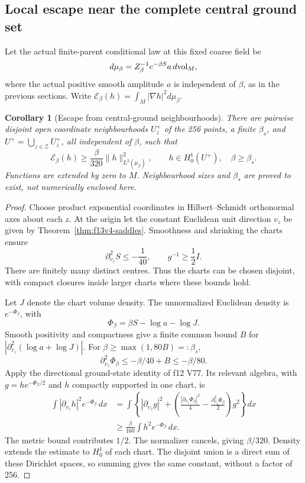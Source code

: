 \documentclass[11pt,oneside]{article}
\newtheorem{corollary}[theorem]{Corollary}
\newcommand{\E}{\mathcal E}
\begin{document}
\subsection{Local escape near the complete central ground set}

Let the actual finite-parent conditional law at this
fixed coarse field be
\[
 d\mu_\beta=Z_\beta^{-1}e^{-\beta S}a\,d{\rm vol}_M ,
\]
where the actual positive smooth amplitude \(a\) is
independent of \(\beta\), as in the previous sections.
Write \(\E_\beta(h)=\int_M|\nabla h|^2d\mu_\beta\).

\begin{corollary}[Escape from central-ground neighbourhoods]
\label{cor:f13v4-escape}
There are pairwise disjoint open coordinate
neighbourhoods \(U_z^+\) of the 256 points, a finite
\(\beta_s\), and \(U^+=\bigcup_{z\in\mathcal Z}U_z^+\),
all independent of \(\beta\), such that
\[
 \E_\beta(h)\ge\frac{\beta}{320}
       \|h\|_{L^2(\mu_\beta)}^2,\qquad
 h\in H_0^1(U^+),\quad\beta\ge\beta_s .
\]
Functions are extended by zero to \(M\).
Neighbourhood sizes and \(\beta_s\) are proved to
exist, not numerically enclosed here.
\end{corollary}

\begin{proof}
Choose product exponential coordinates in
Hilbert--Schmidt orthonormal axes about each \(z\).
At the origin let the constant Euclidean unit
direction \(v_z\) be given by
Theorem~\ref{thm:f13v4-saddles}. Smoothness and
shrinking the charts ensure
\[
 \partial_{v_z}^2S\le-\frac1{40},
 \qquad g^{-1}\ge\frac12 I .
\]
There are finitely many distinct centres. Thus
the charts can be chosen disjoint, with compact
closures inside larger charts where these bounds hold.

Let \(J\) denote the chart volume density.
The unnormalized Euclidean density is
\(e^{-\Phi_\beta}\), with
\[
 \Phi_\beta=\beta S-\log a-\log J .
\]
Smooth positivity and compactness give a finite
common bound \(B\) for
\(\left|\partial_{v_z}^2(\log a+\log J)\right|\).
For \(\beta\ge\max(1,80B)=:\beta_s\),
\[
 \partial_{v_z}^2\Phi_\beta
 \le-\beta/40+B\le-\beta/80 .
\]
Apply the directional ground-state identity of
f12 V77. Its relevant algebra, with
\(g=h e^{-\Phi_\beta/2}\) and \(h\) compactly
supported in one chart, is
\begin{align*}
 \int|\partial_{v_z}h|^2e^{-\Phi_\beta}\,dx
 &=\int\left\{|\partial_{v_z}g|^2+
 \left(\frac{|\partial_{v_z}\Phi_\beta|^2}{4}
 -\frac{\partial_{v_z}^2\Phi_\beta}{2}\right)g^2
 \right\}dx\\
 &\ge\frac{\beta}{160}\int h^2e^{-\Phi_\beta}\,dx .
\end{align*}
The metric bound contributes \(1/2\). The normalizer
cancels, giving \(\beta/320\). Density extends the
estimate to \(H_0^1\) of each chart. The disjoint
union is a direct sum of these Dirichlet spaces,
so summing gives the same constant, without a factor
of 256.
\end{proof}
\end{document}
